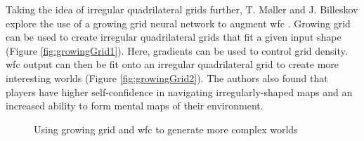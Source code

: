 Taking the idea of irregular quadrilateral grids further, T. Møller and J. Billeskov explore the use of a growing grid neural network to augment \acrshort{wfc} \cite{WFC_Neural_Network}. Growing grid can be used to create irregular quadrilateral grids that fit a given input shape (Figure \ref{fig:growingGrid1}). Here, gradients can be used to control grid density. \acrshort{wfc} output can then be fit onto an irregular quadrilateral grid to create more interesting worlds (Figure \ref{fig:growingGrid2}). The authors also found that players have higher self-confidence in navigating irregularly-shaped maps and an increased ability to form mental maps of their environment.

\begin{figure}[H]
    \centering
    \hfill
    \caption{Using growing grid and \acrshort{wfc} to generate more complex worlds \cite{WFC_Neural_Network}}
    \label{fig:growingGrid}
\end{figure}

